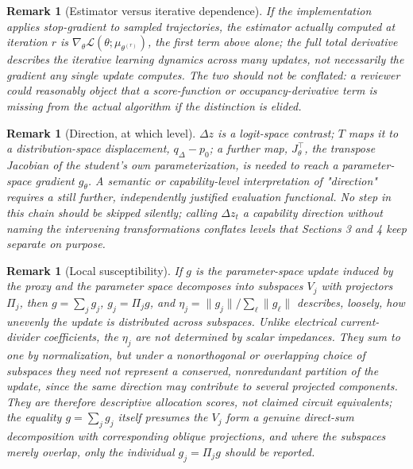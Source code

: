 \documentclass[11pt]{article}
\newtheorem{remark}[definition]{Remark}
\begin{document}
\begin{remark}[Estimator versus iterative dependence]
If the implementation applies stop-gradient to sampled trajectories, the estimator actually computed at iteration $r$ is $\nabla_\theta \mathcal{L}(\theta; \mu_{\theta^{(r)}})$, the first term above alone; the full total derivative describes the iterative learning dynamics across many updates, not necessarily the gradient any single update computes. The two should not be conflated: a reviewer could reasonably object that a score-function or occupancy-derivative term is missing from the actual algorithm if the distinction is elided.
\end{remark}

\begin{remark}[Direction, at which level]
$\Delta z$ is a logit-space contrast; $T$ maps it to a distribution-space displacement, $q_\Delta - p_0$; a further map, $J_\theta^\top$, the transpose Jacobian of the student's own parameterization, is needed to reach a parameter-space gradient $g_\theta$. A semantic or capability-level interpretation of "direction" requires a still further, independently justified evaluation functional. No step in this chain should be skipped silently; calling $\Delta z_t$ a capability direction without naming the intervening transformations conflates levels that Sections 3 and 4 keep separate on purpose.
\end{remark}

\begin{remark}[Local susceptibility]
If $g$ is the parameter-space update induced by the proxy and the parameter space decomposes into subspaces $V_j$ with projectors $\Pi_j$, then $g = \sum_j g_j$, $g_j = \Pi_j g$, and $\eta_j = \|g_j\| / \sum_\ell \|g_\ell\|$ describes, loosely, how unevenly the update is distributed across subspaces. Unlike electrical current-divider coefficients, the $\eta_j$ are not determined by scalar impedances. They sum to one by normalization, but under a nonorthogonal or overlapping choice of subspaces they need not represent a conserved, nonredundant partition of the update, since the same direction may contribute to several projected components. They are therefore descriptive allocation scores, not claimed circuit equivalents; the equality $g = \sum_j g_j$ itself presumes the $V_j$ form a genuine direct-sum decomposition with corresponding oblique projections, and where the subspaces merely overlap, only the individual $g_j = \Pi_j g$ should be reported.
\end{remark}
\end{document}
